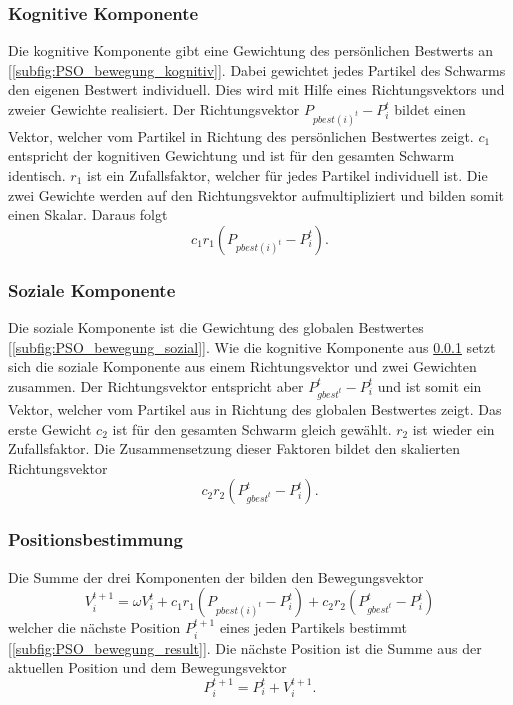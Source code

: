 \documentclass[pdftex,
               12pt,
               DIV=12,
               a4paper,
               twoside,
               parskip=half,
               abstract=true,
               dvipsnames]{scrartcl}
\begin{document}
\subsubsection{Kognitive Komponente}
\label{subsec:PSO_kognitiv}
Die kognitive Komponente gibt eine Gewichtung des pers\"onlichen Bestwerts an [\cref{subfig:PSO_bewegung_kognitiv}]. Dabei gewichtet jedes Partikel des Schwarms den eigenen Bestwert individuell. Dies wird mit Hilfe eines Richtungsvektors und zweier Gewichte realisiert. Der Richtungsvektor $P_{pbest(i)^t}-P_i^t$ bildet einen Vektor, welcher vom Partikel in Richtung des pers\"onlichen Bestwertes zeigt. $c_1$ entspricht der kognitiven Gewichtung und ist f\"ur den gesamten Schwarm identisch. $r_1$ ist ein Zufallsfaktor, welcher f\"ur jedes Partikel individuell ist. Die zwei Gewichte werden auf den Richtungsvektor aufmultipliziert und bilden somit einen Skalar. \cite[vgl.][]{KennedyEberhart01, ZhangWangJi15} Daraus folgt \[c_1r_1\left(P_{pbest(i)^t}-P_i^t\right).\]


\subsubsection{Soziale Komponente}
\label{subsec:PSO_sozial}
Die soziale Komponente ist die Gewichtung des globalen Bestwertes [\cref{subfig:PSO_bewegung_sozial}]. Wie die kognitive Komponente aus \cref{subsec:PSO_kognitiv} setzt sich die soziale Komponente aus einem Richtungsvektor und zwei Gewichten zusammen. Der Richtungsvektor entspricht aber $P_{gbest^t}^t-P_i^t$ und ist somit ein Vektor, welcher vom Partikel aus in Richtung des globalen Bestwertes zeigt. Das erste Gewicht $c_2$ ist f\"ur den gesamten Schwarm gleich gew\"ahlt. $r_2$ ist wieder ein Zufallsfaktor.  Die Zusammensetzung dieser Faktoren bildet den skalierten Richtungsvektor \cite[vgl.][]{KennedyEberhart01, ZhangWangJi15} \[c_2r_2\left(P_{gbest^t}^t-P_i^t\right).\]


\subsubsection{Positionsbestimmung}
\label{subsec:PSO_positionsbestimmung}
Die Summe der drei Komponenten der  bilden den Bewegungsvektor \[V_i^{t+1} = \omega V_i^t + c_1r_1\left(P_{pbest(i)^t}-P_i^t\right) + c_2r_2\left(P_{gbest^t}^t-P_i^t\right)\] welcher die n\"achste Position $P_i^{t+1}$ eines jeden Partikels bestimmt [\cref{subfig:PSO_bewegung_result}]. Die n\"achste Position ist die Summe aus der aktuellen Position und dem Bewegungsvektor \cite[vgl.][]{KennedyEberhart01, ZhangWangJi15} \[P_i^{t+1} = P_i^t + V_i^{t+1}.\]
\end{document}
